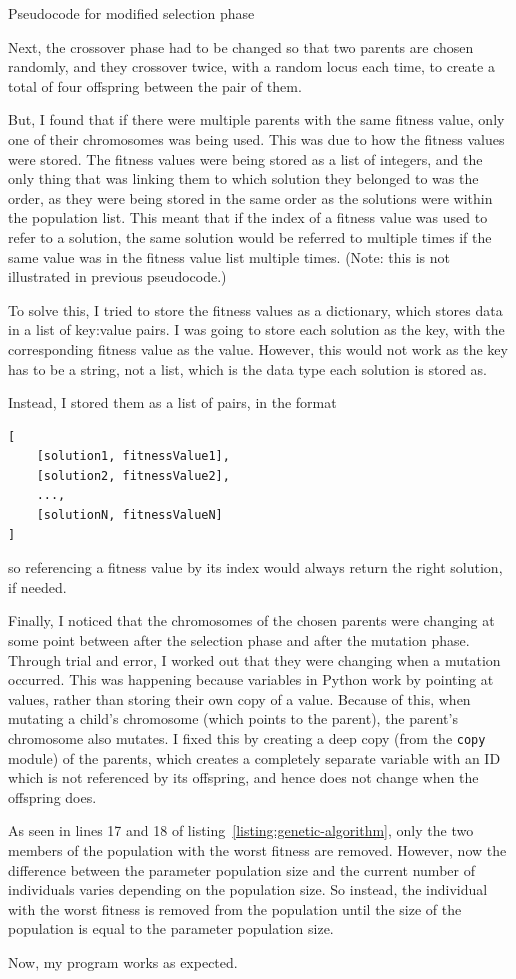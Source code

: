 \begin{listing}[!ht]
	\inputminted[linenos, fontsize=\footnotesize]{text}{code/selection-new.txt}
	\caption{Pseudocode for modified selection phase}
	\label{listing:selection-new}
\end{listing}

Next, the crossover phase had to be changed so that two parents are chosen
randomly, and they crossover twice, with a random locus each time, to create a 
total of four offspring between the pair of them.

But, I found that if there were multiple parents with the same fitness value,
only one of their chromosomes was being used.
This was due to how the fitness values were stored.
The fitness values were being stored as a list of integers, and the only thing 
that was linking them to which solution they belonged to was the order, as they
were being stored in the same order as the solutions were within the population
list.
This meant that if the index of a fitness value was used to refer to a solution,
the same solution would be referred to multiple times if the same value was in
the fitness value list multiple times. (Note: this is not illustrated in 
previous pseudocode.)

To solve this, I tried to store the fitness values as a dictionary, which stores
data in a list of key:value pairs.
I was going to store each solution as the key, with the corresponding fitness
value as the value.
However, this would not work as the key has to be a string, not a list, which is
the data type each solution is stored as.

Instead, I stored them as a list of pairs, in the format
\begin{Verbatim}[tabsize=4]
[
	[solution1, fitnessValue1],
	[solution2, fitnessValue2],
	...,
	[solutionN, fitnessValueN]
]
\end{Verbatim}
so referencing a fitness value by its index would always return the right 
solution, if needed.

Finally, I noticed that the chromosomes of the chosen parents were changing at
some point between after the selection phase and after the mutation phase.
Through trial and error, I worked out that they were changing when a mutation
occurred. 
This was happening because variables in Python work by pointing at values, 
rather than storing their own copy of a value.
Because of this, when mutating a child's chromosome (which points to the 
parent), the parent's chromosome also mutates.
I fixed this by creating a deep copy (from the \verb|copy| module) of the 
parents, which creates a completely separate variable with an ID which is not
referenced by its offspring, and hence does not change when the offspring does.

As seen in lines 17 and 18 of listing~\ref*{listing:genetic-algorithm}, only the
two members of the population with the worst fitness are removed.
However, now the difference between the parameter population size and the 
current number of individuals varies depending on the population size.
So instead, the individual with the worst fitness is removed from the population
until the size of the population is equal to the parameter population size.

Now, my program works as expected.